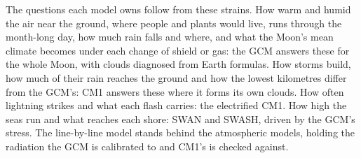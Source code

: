 The questions each model owns follow from these strains. How warm and humid the air near the ground, where
people and plants would live, runs through the month-long day, how much rain falls and where, and what the
Moon's mean climate becomes under each change of shield or gas: the GCM answers these for the whole Moon,
with clouds diagnosed from Earth formulas. How storms build, how much of their rain reaches the ground and
how the lowest kilometres differ from the GCM's: CM1 answers these where it forms its own clouds. How often
lightning strikes and what each flash carries: the electrified CM1. How high the seas run and what reaches
each shore: SWAN and SWASH, driven by the GCM's stress. The line-by-line model stands behind the
atmospheric models, holding the radiation the GCM is calibrated to and CM1's is checked against.
